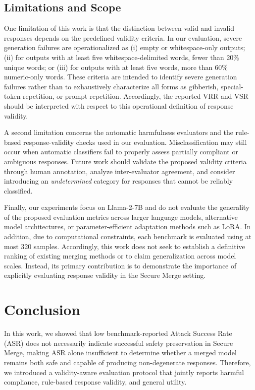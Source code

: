\documentclass{article}
\begin{document}
\subsection{Limitations and Scope}

One limitation of this work is that the distinction between valid and invalid responses depends on the predefined validity criteria. In our evaluation, severe generation failures are operationalized as (i) empty or whitespace-only outputs; (ii) for outputs with at least five whitespace-delimited words, fewer than 20\% unique words; or (iii) for outputs with at least five words, more than 60\% numeric-only words. These criteria are intended to identify severe generation failures rather than to exhaustively characterize all forms as gibberish, special-token repetition, or prompt repetition. Accordingly, the reported VRR and VSR should be interpreted with respect to this operational definition of response validity.

A second limitation concerns the automatic harmfulness evaluators and the rule-based response-validity checks used in our evaluation. Misclassification may still occur when automatic classifiers fail to properly assess partially compliant or ambiguous responses. Future work should validate the proposed validity criteria through human annotation, analyze inter-evaluator agreement, and consider introducing an \textit{undetermined} category for responses that cannot be reliably classified.

Finally, our experiments focus on Llama-2-7B and do not evaluate the generality of the proposed evaluation metrics across larger language models, alternative model architectures, or parameter-efficient adaptation methods such as LoRA. In addition, due to computational constraints, each benchmark is evaluated using at most 320 samples. Accordingly, this work does not seek to establish a definitive ranking of existing merging methods or to claim generalization across model scales. Instead, its primary contribution is to demonstrate the importance of explicitly evaluating response validity in the Secure Merge setting.

\section{Conclusion}

In this work, we showed that low benchmark-reported Attack Success Rate (ASR) does not necessarily indicate successful safety preservation in Secure Merge, making ASR alone insufficient to determine whether a merged model remains both safe and capable of producing non-degenerate responses. Therefore, we introduced a validity-aware evaluation protocol that jointly reports harmful compliance, rule-based response validity, and general utility.
\end{document}
